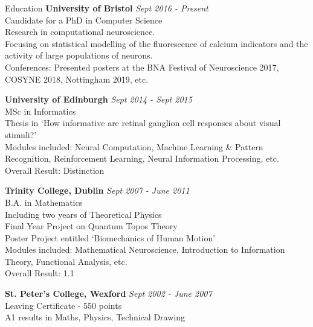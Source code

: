 \documentclass{resume} %
\begin{document}

\begin{rSection}{Education}
{\bf University of Bristol} \hfill {\em Sept 2016 - Present} \\
Candidate for a PhD in Computer Science \\
Research in computational neuroscience. \\
Focusing on statistical modelling of the fluorescence of calcium indicators and the activity of large populations of neurons. \\
Conferences: Presented posters at the BNA Festival of Neuroscience 2017, COSYNE 2018, Nottingham 2019, etc.

{\bf University of Edinburgh} \hfill {\em Sept 2014 - Sept 2015} \\
MSc in Informatics \\
Thesis in `How informative are retinal ganglion cell responses about visual stimuli?' \\
Modules included: Neural Computation, Machine Learning \& Pattern Recognition, Reinforcement Learning, Neural Information Processing, etc.  \smallskip \\
Overall Result: Distinction

{\bf Trinity College, Dublin} \hfill {\em Sept 2007 - June 2011} \\
B.A. in Mathematics \\
Including two years of Theoretical Physics \\
Final Year Project on Quantum Topos Theory \\
Poster Project entitled `Biomechanics of Human Motion' \\
Modules included: Mathematical Neuroscience, Introduction to Information Theory, Functional Analysis, etc. \smallskip \\
Overall Result: 1.1


{\bf St. Peter's College, Wexford} \hfill {\em Sept 2002 - June 2007} \\
Leaving Certificate - 550 points \\
A1 results in Maths, Physics, Technical Drawing
\end{rSection}

\end{document}
